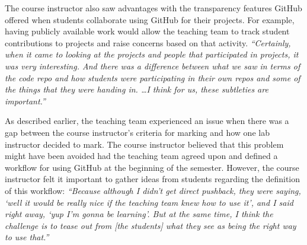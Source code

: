 
The course instructor also saw advantages with the transparency features GitHub offered when students collaborate using GitHub for their projects. For example, having publicly available work would allow the teaching team to track student contributions to projects and raise concerns based on that activity. \textit{``Certainly, when it came to looking at the projects and people that participated in projects, it was very interesting. And there was a difference between what we saw in terms of the code repo and how students were participating in their own repos and some of the things that they were handing in. \ldots I think for us, these subtleties are important.''}


As described earlier, the teaching team experienced an issue when there was a gap between the course instructor's criteria for marking and how one lab instructor decided to mark. The course instructor believed that this problem might have been avoided had the teaching team agreed upon and defined a workflow for using GitHub at the beginning of the semester. However, the course instructor felt it important to gather ideas from students regarding the definition of this workflow: \textit{``Because although I didn't get direct pushback, they were saying, `well it would be really nice if the teaching team knew how to use it', and I said right away, `yup I'm gonna be learning'. But at the same time, I think the challenge is to tease out from [the students] what they see as being the right way to use that.''}

